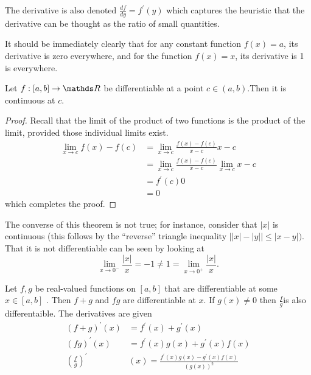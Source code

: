 \begin{rem*}
The derivative is also denoted $\frac{df}{dy}=f^{\prime}\left(y\right)$
which captures the heuristic that the derivative can be thought as
the ratio of small quantities.
\end{rem*}
\begin{example}
\label{exa:derivativeConstant}It should be immediately clearly that
for any constant function $f\left(x\right)=a$, its derivative is
zero everywhere, and for the function $f\left(x\right)=x$, its derivative
is 1 is everywhere.
\end{example}

\begin{prop}
\label{prop:differentiableImpliesContinuous}Let $f:\left[a,b\right]\to\R$
be differentiable at a point $c\in\left(a,b\right).$Then it is continuous
at $c.$
\end{prop}

\begin{proof}
Recall that the limit of the product of two functions is the product
of the limit, provided those individual limits exist. 
\begin{align*}
\lim_{x\to c}f\left(x\right)-f\left(c\right) & =\lim_{x\to c}\frac{f\left(x\right)-f\left(c\right)}{x-c}x-c\\
 & =\lim_{x\to c}\frac{f\left(x\right)-f\left(c\right)}{x-c}\lim_{x\to c}x-c\\
 & =f^{\prime}\left(c\right)0\\
 & =0
\end{align*}
which completes the proof.
\end{proof}
\begin{rem*}
The converse of this theorem is not true; for instance, consider that
$\lvert x\rvert$ is continuous (this follows by the ``reverse''
triangle inequality $\lvert\lvert x\rvert-\lvert y\rvert\rvert\leq\lvert x-y\rvert)$.
That it is not differentiable can be seen by looking at 
\[
\lim_{x\to0^{-}}\frac{\lvert x\rvert}{x}=-1\neq1=\lim_{x\to0^{+}}\frac{\lvert x\rvert}{x}.
\]
\end{rem*}
\begin{prop}
\label{prop:algebraOfDifferentiableFunctions}Let $f,g$ be real-valued
functions on $\left[a,b\right]$ that are differentiable at some $x\in\left[a,b\right]$
. Then $f+g$ and $fg$ are differentiable at $x.$ If $g\left(x\right)\neq0$
then $\frac{f}{g}$is also differentaible. The derivatives are given
\begin{align}
\left(f+g\right)^{\prime}\left(x\right) & =f^{\prime}\left(x\right)+g^{\prime}\left(x\right)\\
\left(fg\right)^{\prime}\left(x\right) & =f^{\prime}\left(x\right)g\left(x\right)+g^{\prime}\left(x\right)f\left(x\right)\\
\left(\frac{f}{g}\right)^{\prime} & \left(x\right)=\frac{f^{\prime}\left(x\right)g\left(x\right)-g^{\prime}\left(x\right)f\left(x\right)}{\left(g\left(x\right)\right)^{2}}
\end{align}
\end{prop}

